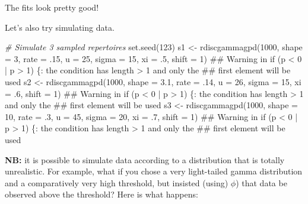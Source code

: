 \documentclass[]{article}
\newcommand{\hlnum}[1]{\textcolor[rgb]{0.816,0.125,0.439}{#1}}%
\newcommand{\hlstr}[1]{\textcolor[rgb]{0.251,0.627,0.251}{#1}}%
\newcommand{\hlcom}[1]{\textcolor[rgb]{0.502,0.502,0.502}{\textit{#1}}}%
\newcommand{\hlstd}[1]{\textcolor[rgb]{0.251,0.251,0.251}{#1}}%
\newcommand{\hlkwc}[1]{\textcolor[rgb]{0.251,0.251,0.251}{#1}}%
\newcommand{\hlkwd}[1]{\textcolor[rgb]{0.878,0.439,0.125}{#1}}%
\newenvironment{Shaded}{\begin{myshaded}}{\end{myshaded}}
\newcommand{\KeywordTok}[1]{\hlkwd{#1}}
\newcommand{\DataTypeTok}[1]{\hlkwc{#1}}
\newcommand{\DecValTok}[1]{\hlnum{#1}}
\newcommand{\FloatTok}[1]{\hlnum{#1}}
\newcommand{\StringTok}[1]{\hlstr{#1}}
\newcommand{\CommentTok}[1]{\hlcom{#1}}
\newcommand{\NormalTok}[1]{\hlstd{#1}}
\theoremstyle{definition}
\theoremstyle{definition}
\theoremstyle{definition}
\theoremstyle{remark}
\begin{document}
The fits look pretty good!

Let's also try simulating data.

\begin{Shaded}
\begin{Highlighting}[]
\CommentTok{# Simulate 3 sampled repertoires}
\KeywordTok{set.seed}\NormalTok{(}\DecValTok{123}\NormalTok{)}
\NormalTok{s1 <-}\StringTok{ }\KeywordTok{rdiscgammagpd}\NormalTok{(}\DecValTok{1000}\NormalTok{, }\DataTypeTok{shape =} \DecValTok{3}\NormalTok{, }\DataTypeTok{rate =} \NormalTok{.}\DecValTok{15}\NormalTok{, }\DataTypeTok{u =} \DecValTok{25}\NormalTok{, }\DataTypeTok{sigma =} \DecValTok{15}\NormalTok{,}
                    \DataTypeTok{xi =} \NormalTok{.}\DecValTok{5}\NormalTok{, }\DataTypeTok{shift =} \DecValTok{1}\NormalTok{)}
\NormalTok{## Warning in if (p < 0 | p > 1) \{: the condition has length > 1 and only the}
\NormalTok{## first element will be used}
\NormalTok{s2 <-}\StringTok{ }\KeywordTok{rdiscgammagpd}\NormalTok{(}\DecValTok{1000}\NormalTok{, }\DataTypeTok{shape =} \FloatTok{3.1}\NormalTok{, }\DataTypeTok{rate =} \NormalTok{.}\DecValTok{14}\NormalTok{, }\DataTypeTok{u =} \DecValTok{26}\NormalTok{, }\DataTypeTok{sigma =} \DecValTok{15}\NormalTok{,}
                    \DataTypeTok{xi =} \NormalTok{.}\DecValTok{6}\NormalTok{, }\DataTypeTok{shift =} \DecValTok{1}\NormalTok{)}
\NormalTok{## Warning in if (p < 0 | p > 1) \{: the condition has length > 1 and only the}
\NormalTok{## first element will be used}
\NormalTok{s3 <-}\StringTok{ }\KeywordTok{rdiscgammagpd}\NormalTok{(}\DecValTok{1000}\NormalTok{, }\DataTypeTok{shape =} \DecValTok{10}\NormalTok{, }\DataTypeTok{rate =} \NormalTok{.}\DecValTok{3}\NormalTok{, }\DataTypeTok{u =} \DecValTok{45}\NormalTok{, }\DataTypeTok{sigma =} \DecValTok{20}\NormalTok{,}
                    \DataTypeTok{xi =} \NormalTok{.}\DecValTok{7}\NormalTok{, }\DataTypeTok{shift =} \DecValTok{1}\NormalTok{)}
\NormalTok{## Warning in if (p < 0 | p > 1) \{: the condition has length > 1 and only the}
\NormalTok{## first element will be used}
\end{Highlighting}
\end{Shaded}

\textbf{NB:} it is possible to simulate data according to a distribution
that is totally unrealistic. For example, what if you chose a very
light-tailed gamma distribution and a comparatively very high threshold,
but insisted (using) \(\phi\)) that data be observed above the
threshold? Here is what happens:
\end{document}
